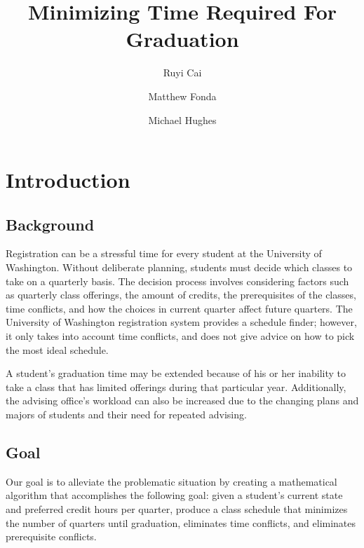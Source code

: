 \documentclass[11pt]{article} %
\title{Minimizing Time Required For Graduation}
\author{Ruyi Cai \and Matthew Fonda \and Michael Hughes}
\begin{document}
\maketitle

\tableofcontents
\pagebreak




\section{Introduction} \subsection{Background} Registration can be a stressful
time for every student at the University of Washington. Without deliberate
planning, students must decide which classes to take on a quarterly basis. The
decision process involves considering factors such as quarterly class
offerings, the amount of credits, the prerequisites of the classes, time
conflicts, and how the choices in current quarter affect future quarters. The
University of Washington registration system provides a schedule finder;
however, it only takes into account time conflicts, and does not give advice on
how to pick the most ideal schedule. 

A student's graduation time may be extended because of his or her inability to
take a class that has limited offerings during that particular year.
Additionally, the advising office’s workload can also be increased due to the
changing plans and majors of students and their need for repeated advising. 

\subsection{Goal} Our goal is to alleviate the problematic situation by creating
a mathematical algorithm that accomplishes the following goal: given a student's
current state and preferred credit hours per quarter, produce a class schedule
that minimizes the number of quarters until graduation, eliminates time
conflicts, and eliminates prerequisite conflicts.
\end{document}
